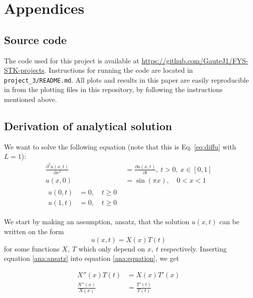 \section{Appendices}
\subsection{Source code}

The code used for this project is available at \url{https://github.com/GauteJ1/FYS-STK-projects}. Instructions for running the code are located in \texttt{project\_3/README.md}.
All plots and results in this paper are easily reproducible in from the plotting files in this repository, by following the instructions mentioned above.

\subsection{Derivation of analytical solution}\label{appendixB}
We want to solve the following equation (note that this is Eq. \ref{eq:diffu} with $L=1$):
\begin{align}\label{ana:equation}
\frac{\partial^2 u(x,t)}{\partial x^2}  &=\frac{\partial u(x,t)}{\partial t}, \ t>0, \ x\in [0, 1] \\
\label{ana:init}
u(x, 0) &= \sin(\pi x), \quad 0 < x < 1 \\
\begin{split}
\label{ana:bound}
    u(0,t) &= 0, \quad t\geq 0 \\
    u(1,t) &= 0, \quad t\geq 0
\end{split}
\end{align}

We start by making an assumption, ansatz, that the solution $u(x,t)$ can be written on the form
\begin{equation}\label{ana:ansatz}
u(x,t) = X(x)T(t)
\end{equation}
for some functions $X,\ T$ which only depend on $x,\ t$ respectively.
Inserting equation \ref{ana:ansatz} into equation \ref{ana:equation}, we get

\begin{align}
    X''(x)T(t) &= X(x) T'(x) \nonumber \\
    \frac{X''(x)}{X(x)} &= \frac{T'(t)}{T(t)} \label{ana:sepa}
\end{align}

